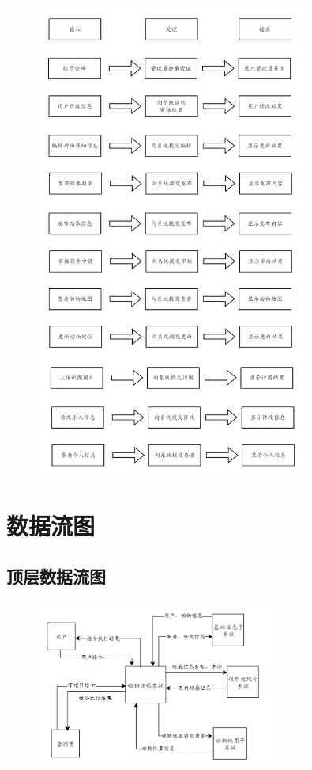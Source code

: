 \documentclass[12pt,a4paper,UTF8]{article}
\begin{document}
\begin{figure}[H]
  \centering
  \includegraphics[width=0.8\textwidth]{figures/ipo2.png}
\end{figure}

\section{数据流图}

\subsection{顶层数据流图}

\begin{figure}[H]
  \centering
  \includegraphics[width=0.7\textwidth]{figures/df1.png}
\end{figure}
\end{document}

